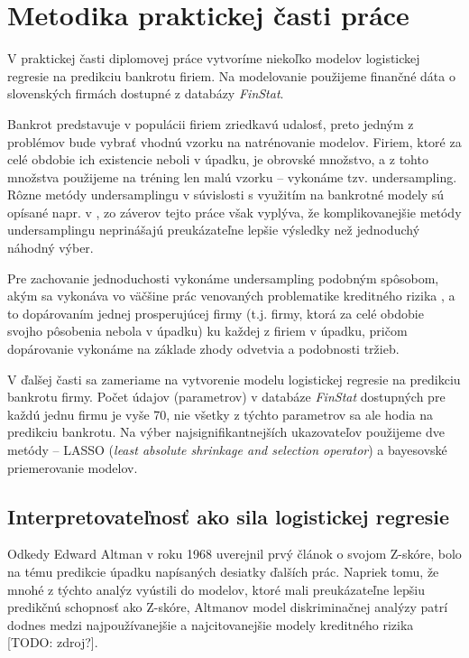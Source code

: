 \section{Metodika praktickej časti práce}
\label{metodika}

V praktickej časti diplomovej práce vytvoríme niekoľko modelov logistickej regresie na predikciu bankrotu firiem.
Na modelovanie použijeme finančné dáta o slovenských firmách dostupné z databázy \emph{FinStat}.

Bankrot predstavuje v populácii firiem zriedkavú udalosť, preto jedným z problémov bude vybrať vhodnú vzorku na natrénovanie modelov.
Firiem, ktoré za celé obdobie ich existencie neboli v úpadku, je obrovské množstvo, a z tohto množstva použijeme na tréning len malú vzorku – vykonáme tzv. undersampling.
Rôzne metódy undersamplingu v súvislosti s využitím na bankrotné modely sú opísané napr. v \cite{protopapadakis},
zo záverov tejto práce však vyplýva, že komplikovanejšie metódy undersamplingu neprinášajú preukázateľne lepšie výsledky než jednoduchý náhodný výber.

Pre zachovanie jednoduchosti vykonáme undersampling podobným spôsobom, akým sa vykonáva vo väčšine prác venovaných problematike kreditného rizika \cite{zmijewski},
a to dopárovaním jednej prosperujúcej firmy (t.j. firmy, ktorá za celé obdobie svojho pôsobenia nebola v úpadku) ku každej z firiem v úpadku,
pričom dopárovanie vykonáme na základe zhody odvetvia a podobnosti tržieb.

V ďalšej časti sa zameriame na vytvorenie modelu logistickej regresie na predikciu bankrotu firmy.
Počet údajov (parametrov) v databáze \emph{FinStat} dostupných pre každú jednu firmu je vyše 70, nie všetky z týchto parametrov sa ale hodia na predikciu bankrotu.
Na výber najsignifikantnejších ukazovateľov použijeme dve metódy – LASSO (\emph{least absolute shrinkage and selection operator}) a bayesovské priemerovanie modelov.

\subsection{Interpretovateľnosť ako sila logistickej regresie} \label{model interpretability}

Odkedy Edward Altman v roku 1968 uverejnil prvý článok o svojom Z-skóre, bolo na tému predikcie úpadku napísaných desiatky ďalších prác.
Napriek tomu, že mnohé z týchto analýz vyústili do modelov, ktoré mali preukázateľne lepšiu predikčnú schopnosť ako Z-skóre,
Altmanov model diskriminačnej analýzy patrí dodnes medzi najpoužívanejšie a najcitovanejšie modely kreditného rizika [TODO: zdroj?].

